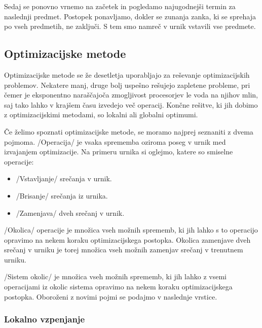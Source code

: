 \documentclass[a4paper]{article}
\begin{document}
   Sedaj se ponovno vrnemo na začetek in pogledamo najugodnejši termin za naslednji
   predmet. Postopek ponavljamo, dokler se zunanja zanka, ki se sprehaja po vseh predmetih,
   ne zaključi. S tem smo namreč v urnik vstavili vse predmete.

\subsection{Optimizacijske metode} %

Optimizacijske metode se že desetletja uporabljajo za reševanje optimizacijskih problemov.
Nekatere manj, druge bolj uspešno rešujejo zapletene probleme, pri čemer je eksponentno
naraščajoča zmogljivost procesorjev le voda na njihov mlin, saj tako lahko v krajšem
času izvedejo več operacij. Končne rešitve, ki jih dobimo z optimizacijskimi metodami,
so lokalni ali globalni optimumi.

Če želimo spoznati optimizacijske metode, se moramo najprej seznaniti z dvema pojmoma.
/Operacija/ je vsaka sprememba oziroma poseg v urnik med izvajanjem optimizacije.
Na primeru urnika si oglejmo, katere so smiselne operacije:

   
   \begin{itemize}
      \item /Vstavljanje/ srečanja v urnik.
      \item /Brisanje/ srečanja iz urnika.
      \item /Zamenjava/ dveh srečanj v urnik.
   \end{itemize}

/Okolica/ operacije je množica vseh možnih sprememb, ki jih lahko s to operacijo
opravimo na nekem koraku optimizacijskega postopka. Okolica zamenjave dveh srečanj v urniku
je torej množica vseh možnih zamenjav srečanj v trenutnem urniku.

/Sistem okolic/ je množica vseh možnih sprememb, ki jih lahko z vsemi operacijami iz
okolic sistema opravimo na nekem koraku optimizacijskega postopka. Oboroženi z novimi pojmi
se podajmo v naslednje vrstice.

\subsubsection{Lokalno vzpenjanje} %
\end{document}
